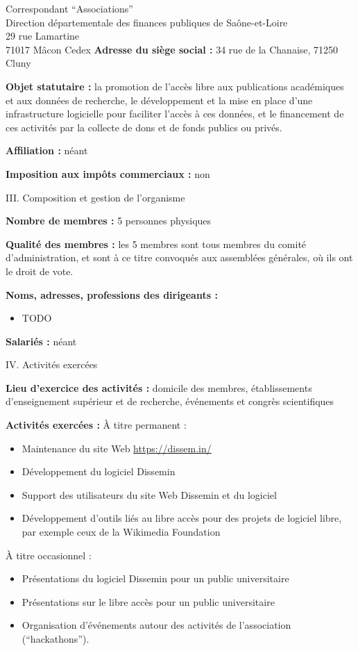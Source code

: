 \documentclass[11pt]{lettre}
\begin{document}
\begin{letter}{Correspondant ``Associations''\\Direction départementale des
  finances publiques de Saône-et-Loire\\29 rue Lamartine\\71017 Mâcon Cedex}
  \textbf{Adresse du siège social :} 34 rue de la Chanaise, 71250 Cluny

  \textbf{Objet statutaire :} la promotion de l'accès libre aux publications académiques
  et aux données de recherche, le développement et la mise en place d'une
  infrastructure logicielle pour faciliter l'accès à ces données, et le
  financement de ces activités par la collecte de dons et de fonds publics ou
  privés.

  \textbf{Affiliation :} néant

  \textbf{Imposition aux impôts commerciaux :} non

  {\Large III. Composition et gestion de l'organisme }

  \textbf{Nombre de membres :} 5 personnes physiques

  \textbf{Qualité des membres :} les 5 membres sont tous membres du comité
  d'administration, et sont à ce titre convoqués aux assemblées générales, où
  ils ont le droit de vote.

  \textbf{Noms, adresses, professions des dirigeants :}
  \begin{itemize}
    \item TODO
  \end{itemize}

  \textbf{Salariés :} néant

  {\Large IV. Activités exercées}

  \textbf{Lieu d'exercice des activités :} domicile des membres, établissements
  d'enseignement supérieur et de recherche, événements et congrès scientifiques

  \textbf{Activités exercées :} À titre permanent :

  \begin{itemize}
    \item Maintenance du site Web \url{https://dissem.in/}
    \item Développement du logiciel Dissemin
    \item Support des utilisateurs du site Web Dissemin et du logiciel
    \item Développement d'outils liés au libre accès pour des projets de
      logiciel libre, par exemple ceux de la Wikimedia Foundation
  \end{itemize}

  À titre occasionnel :

  \begin{itemize}
    \item Présentations du logiciel Dissemin pour un public universitaire
    \item Présentations sur le libre accès pour un public universitaire
    \item Organisation d'événements autour des activités de l'association
      (``hackathons'').
  \end{itemize}


\end{letter}
\end{document}
